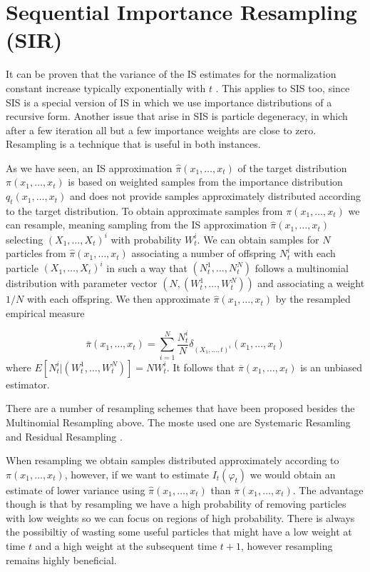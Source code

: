 \section{Sequential Importance Resampling (SIR)} \label{sec{SIR}}

It can be proven that the variance of the IS estimates for the normalization constant increase typically exponentially with $t$ \cite{Kong}. This applies to SIS too, since SIS is a special version of IS in which we use importance distributions of a recursive form.
Another issue that arise in SIS is particle degeneracy, in which after a few iteration all but a few importance weights are close to zero.
Resampling is a technique that is useful in both instances.

As we have seen, an IS approximation $\hat{\pi}(x_1, \dots, x_t)$ of the target distribution $\pi(x_1, \dots, x_t)$ is based on weighted samples from the importance distribution $q_t(x_1, \dots, x_t)$ and does not provide samples approximately distributed according to the target distribution. To obtain approximate samples from $\pi(x_1, \dots, x_t)$ we can resample, meaning sampling from the IS approximation $\hat{\pi}(x_1, \dots, x_t)$ selecting $(X_1, \dots, X_t)^i$ with probability $W_t^i$. We can obtain samples for $N$ particles from $\hat{\pi}(x_1, \dots, x_t)$ associating a number of offspring $N^i_t$ with each particle $(X_1, \dots, X_t)^i$ in such a way that $(N_t^1, \dots, N^N_t)$ follows a multinomial distribution with parameter vector $(N, (W_t^1, \dots, W_t^N))$ and associating a weight $1/N$ with each offspring. We then approximate $\hat{\pi}(x_1, \dots, x_t)$ by the resampled empirical measure

\begin{equation*}
    \overline{\pi}(x_1, \dots, x_t) = \sum_{i=1}^N \frac{N^i_t}{N} \delta_{(X_1, \dots, t)^i}(x_1, \dots, x_t)
\end{equation*}
where $E[N^i_t | (W_t^1, \dots, W_t^N) ] = N W^i_t$. It follows that $\overline{\pi}(x_1, \dots, x_t)$ is an unbiased estimator.

There are a number of resampling schemes that have been proposed besides the Multinomial Resampling above. The moste used one are Systemaric Resamling and Residual Resampling \cite{DoucetTutorial}.

When resampling we obtain samples distributed approximately according to $\pi(x_1, \dots, x_t)$, however, if we want to estimate $I_t(\varphi_t)$ we would obtain an estimate of lower variance using $\hat{\pi}(x_1, \dots, x_t)$ than $\overline{\pi}(x_1, \dots, x_t)$. The advantage though is that by resampling we have a high probability of removing particles with low weights so we can focus on regions of high probability. There is always the possibiltiy of wasting some useful particles that might have a low weight at time $t$ and a high weight at the subsequent time $t+1$, however resampling remains highly beneficial.

